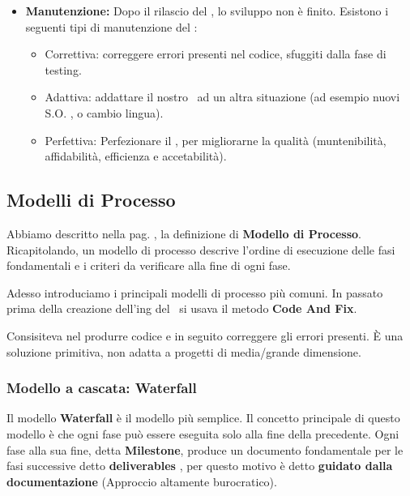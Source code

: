 \begin{itemize}
\begin{itemize}
        \end{itemize}
    \item \textbf{Manutenzione: }
        Dopo il rilascio del \sw, lo sviluppo non \`e finito. Esistono i seguenti tipi di manutenzione del \sw :
        \begin{itemize}
            \item Correttiva: 
                correggere errori presenti nel codice, sfuggiti dalla fase di testing.
            \item Adattiva:
                addattare il nostro \sw\ ad un altra situazione (ad esempio nuovi S.O. , o cambio lingua).
            \item Perfettiva:
                Perfezionare il \sw, per migliorarne la qualit\`a (muntenibilit\`a, affidabilit\`a, efficienza e accetabilit\`a).
        \end{itemize}
\end{itemize}
\subsection{Modelli di Processo}
Abbiamo descritto nella pag. \pageref{quote:modello_di_processo}, la definizione di \textbf{Modello di Processo}. Ricapitolando, un modello di processo descrive l'ordine di esecuzione delle fasi fondamentali e i criteri da verificare alla fine di ogni fase.

Adesso introduciamo i principali modelli di processo pi\`u comuni.
In passato prima della creazione dell'ing del \sw\ si usava il metodo \textbf{Code And Fix}.

Consisiteva nel produrre codice e in seguito correggere gli errori presenti. \`E una soluzione primitiva,
non adatta a progetti di media/grande dimensione.
\subsubsection{Modello a cascata: Waterfall}
Il modello \textbf{Waterfall} \`e il modello pi\`u semplice. Il concetto principale di questo modello \`e che ogni fase pu\`o essere eseguita solo alla fine della precedente.
Ogni fase alla sua fine, detta \textbf{Milestone}, produce un documento fondamentale per le fasi successive detto \textbf{deliverables}
, per questo motivo \`e detto \textbf{guidato dalla documentazione} (Approccio altamente burocratico).

